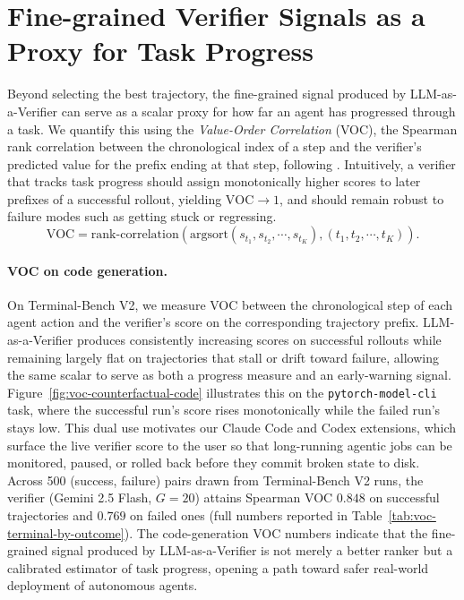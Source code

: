\section{Fine-grained Verifier Signals as a Proxy for Task Progress}
\label{sec:progress}

Beyond selecting the best trajectory, the fine-grained signal produced by LLM-as-a-Verifier can serve as a scalar proxy for how far an agent has progressed through a task. We quantify this using the \emph{Value-Order Correlation} (VOC), the Spearman rank correlation between the chronological index of a step and the verifier's predicted value for the prefix ending at that step, following \citet{ICLR2025_54854cf1}. Intuitively, a verifier that tracks task progress should assign monotonically higher scores to later prefixes of a successful rollout, yielding $\mathrm{VOC}\to 1$, and should remain robust to failure modes such as getting stuck or regressing.
\begin{equation}
\mathrm{VOC} = \mathrm{rank\text{-}correlation}\!\left(
\mathrm{argsort}(s_{t_1}, s_{t_2}, \cdots, s_{t_K}),
(t_1, t_2, \cdots, t_K)
\right).
\end{equation}


\paragraph{VOC on code generation.} On Terminal-Bench V2, we measure VOC between the chronological step of each agent action and the verifier's score on the corresponding trajectory prefix. LLM-as-a-Verifier produces consistently increasing scores on successful rollouts while remaining largely flat on trajectories that stall or drift toward failure, allowing the same scalar to serve as both a progress measure and an early-warning signal. Figure~\ref{fig:voc-counterfactual-code} illustrates this on the \texttt{pytorch-model-cli} task, where the successful run's score rises monotonically while the failed run's stays low. This dual use motivates our Claude Code and Codex extensions, which surface the live verifier score to the user so that long-running agentic jobs can be monitored, paused, or rolled back before they commit broken state to disk. Across 500 (success, failure) pairs drawn from Terminal-Bench V2 runs, the verifier (Gemini 2.5 Flash, $G{=}20$) attains Spearman VOC $0.848$ on successful trajectories and $0.769$ on failed ones (full numbers reported in Table~\ref{tab:voc-terminal-by-outcome}). The code-generation VOC numbers indicate that the fine-grained signal produced by LLM-as-a-Verifier is not merely a better ranker but a calibrated estimator of task progress, opening a path toward safer real-world deployment of autonomous agents.


